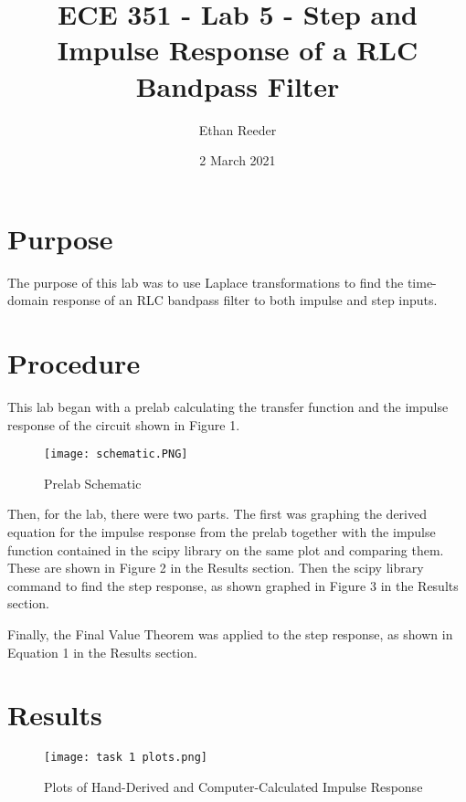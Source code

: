 \documentclass[12pt]{article}
\title{ECE 351 - Lab 5 - Step and Impulse Response of a RLC Bandpass Filter}
\author{Ethan Reeder}
\date{2 March 2021}
\begin{document}
\lstset{language=Python}

\maketitle

\newpage

\tableofcontents

\newpage

\section{Purpose}

The purpose of this lab was to use Laplace transformations to find the time-domain response of an RLC bandpass filter to both impulse and step inputs.

\section{Procedure}

This lab began with a prelab calculating the transfer function and the impulse response of the circuit shown in Figure 1.

\begin{figure}[h!]
    \centering
    \texttt{[image: schematic.PNG]}
    \caption{Prelab Schematic}
\end{figure}

Then, for the lab, there were two parts. The first was graphing the derived equation for the impulse response from the prelab together with the impulse function contained in the scipy library on the same plot and comparing them. These are shown in Figure 2 in the Results section. Then the scipy library command to find the step response, as shown graphed in Figure 3 in the Results section.

Finally, the Final Value Theorem was applied to the step response, as shown in Equation 1 in the Results section.

\newpage

\section{Results}

\begin{figure}[h!]
    \centering
    \texttt{[image: task 1 plots.png]}
    \caption{Plots of Hand-Derived and Computer-Calculated Impulse Response}
\end{figure}
\end{document}
